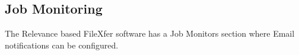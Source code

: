 

\subsection{Job Monitoring}
The Relevance based FileXfer software has a Job Monitors section
where Email notifications can be configured.
